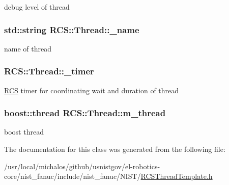 debug level of thread \hypertarget{classRCS_1_1Thread_a665a238614304950e1c19e7d03e236e1}{
\subsubsection[{\-\_\-name}]{\setlength{\rightskip}{0pt plus 5cm}std\-::string R\-C\-S\-::\-Thread\-::\-\_\-name\hspace{0.3cm}{\ttfamily [protected]}}}\label{classRCS_1_1Thread_a665a238614304950e1c19e7d03e236e1}
name of thread \hypertarget{classRCS_1_1Thread_afddbc109781286f80017468dcccc6b10}{
\subsubsection[{\-\_\-timer}]{ R\-C\-S\-::\-Thread\-::\-\_\-timer\hspace{0.3cm}{\ttfamily [protected]}}}\label{classRCS_1_1Thread_afddbc109781286f80017468dcccc6b10}
\hyperlink{namespaceRCS}{R\-C\-S} timer for coordinating wait and duration of thread \hypertarget{classRCS_1_1Thread_a06b98cfbb4d084f3776ad0ab8731a60a}{
\subsubsection[{m\-\_\-thread}]{\setlength{\rightskip}{0pt plus 5cm}boost\-::thread R\-C\-S\-::\-Thread\-::m\-\_\-thread\hspace{0.3cm}{\ttfamily [protected]}}}\label{classRCS_1_1Thread_a06b98cfbb4d084f3776ad0ab8731a60a}
boost thread 

The documentation for this class was generated from the following file\-:\begin{DoxyCompactItemize}
\item 
/usr/local/michalos/github/usnistgov/el-\/robotics-\/core/nist\-\_\-fanuc/include/nist\-\_\-fanuc/\-N\-I\-S\-T/\hyperlink{RCSThreadTemplate_8h}{R\-C\-S\-Thread\-Template.\-h}\end{DoxyCompactItemize}
